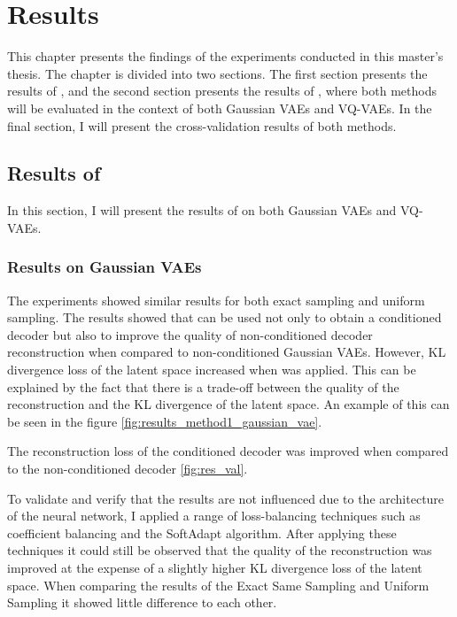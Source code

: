 \chapter{Results}

This chapter presents the findings of the experiments conducted in this master's thesis. The chapter is divided into two sections.
The first section presents the results of , and the second section presents the results of , where both methods will be evaluated in the context of both Gaussian VAEs and VQ-VAEs. In the final section, I will present the cross-validation results of both methods.

\section{Results of }

In this section, I will present the results of  on both Gaussian VAEs and VQ-VAEs.

\subsection{Results on Gaussian VAEs}

The experiments showed similar results for both exact sampling and uniform sampling. The results showed that  can be used not only to obtain a conditioned decoder but also to improve the quality of non-conditioned decoder reconstruction when compared to non-conditioned Gaussian VAEs. However, KL divergence loss of the latent space increased when  was applied. This can be explained by the fact that there is a trade-off between the quality of the reconstruction and the KL divergence of the latent space. An example of this can be seen in the figure \ref{fig:results_method1_gaussian_vae}. 

The reconstruction loss of the conditioned decoder was improved when compared to the non-conditioned decoder \ref{fig:res_val}.

To validate and verify that the results are not influenced due to the architecture of the neural network, I applied a range of loss-balancing techniques such as coefficient balancing and the SoftAdapt algorithm. After applying these techniques it could still be observed that the quality of the reconstruction was improved at the expense of a slightly higher KL divergence loss of the latent space. When comparing the results of the Exact Same Sampling and Uniform Sampling it showed little difference to each other.

